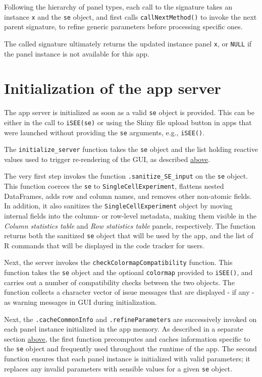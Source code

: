 \documentclass[]{book}
\begin{document}
Following the hierarchy of panel types, each call to the signature takes an instance \texttt{x} and the \texttt{se} object, and first calls \texttt{callNextMethod()} to invoke the next parent signature, to refine generic parameters before processing specific ones.

The called signature ultimately returns the updated instance panel \texttt{x}, or \texttt{NULL} if the panel instance is not available for this app.

\hypertarget{initialization-of-the-app-server}{%
\section{Initialization of the app server}\label{initialization-of-the-app-server}}

The app server is initialized as soon as a valid \texttt{se} object is provided.
This can be either in the call to \texttt{iSEE(se)} or using the Shiny file upload button in apps that were launched without providing the \texttt{se} arguments, e.g., \texttt{iSEE()}.

The \texttt{initialize\_server} function takes the \texttt{se} object and the list holding reactive values used to trigger re-rendering of the GUI, as described \protect\hyperlink{robjects}{above}.

The very first step invokes the function \texttt{.sanitize\_SE\_input} on the \texttt{se} object.
This function coerces the \texttt{se} to \texttt{SingleCellExperiment}, flattens nested DataFrames, adds row and column names, and removes other non-atomic fields.
In addition, it also sanitizes the \texttt{SingleCellExperiment} object by moving internal fields into the column- or row-level metadata, making them visible in the \emph{Column statistics table} and \emph{Row statistics table} panels, respectively. The function returns both the sanitized \texttt{se} object that will be used by the app, and the list of R commands that will be displayed in the code tracker for users.

Next, the server invokes the \texttt{checkColormapCompatibility} function.
This function takes the \texttt{se} object and the optioanl \texttt{colormap} provided to \texttt{iSEE()}, and carries out a number of compatibility checks between the two objects.
The function collects a character vector of issue messages that are displayed - if any - as warning messages in GUI during initialization.

Next, the \texttt{.cacheCommonInfo} and \texttt{.refineParameters} are successively invoked on each panel instance initialized in the app memory.
As described in a separate section \protect\hyperlink{panel-api}{above}, the first function precomputes and caches information specific to the \texttt{se} object and frequently used throughout the runtime of the app.
The second function ensures that each panel instance is initialized with valid parameters; it replaces any invalid parameters with sensible values for a given \texttt{se} object.
\end{document}
